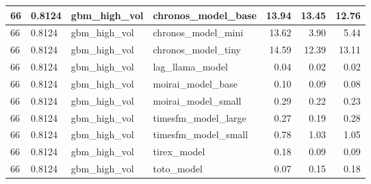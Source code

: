 {\begin{tabular}{llllrrr}
66 & 0.8124 & gbm\_high\_vol & chronos\_model\_base & 13.94 & 13.45 & 12.76 \\
\midrule
66 & 0.8124 & gbm\_high\_vol & chronos\_model\_mini & 13.62 & 3.90 & 5.44 \\
\midrule
66 & 0.8124 & gbm\_high\_vol & chronos\_model\_tiny & 14.59 & 12.39 & 13.11 \\
\midrule
66 & 0.8124 & gbm\_high\_vol & lag\_llama\_model & 0.04 & 0.02 & 0.02 \\
\midrule
66 & 0.8124 & gbm\_high\_vol & moirai\_model\_base & 0.10 & 0.09 & 0.08 \\
\midrule
66 & 0.8124 & gbm\_high\_vol & moirai\_model\_small & 0.29 & 0.22 & 0.23 \\
\midrule
66 & 0.8124 & gbm\_high\_vol & timesfm\_model\_large & 0.27 & 0.19 & 0.28 \\
\midrule
66 & 0.8124 & gbm\_high\_vol & timesfm\_model\_small & 0.78 & 1.03 & 1.05 \\
\midrule
66 & 0.8124 & gbm\_high\_vol & tirex\_model & 0.18 & 0.09 & 0.09 \\
\midrule
66 & 0.8124 & gbm\_high\_vol & toto\_model & 0.07 & 0.15 & 0.18 \\
\bottomrule
\end{tabular}
}